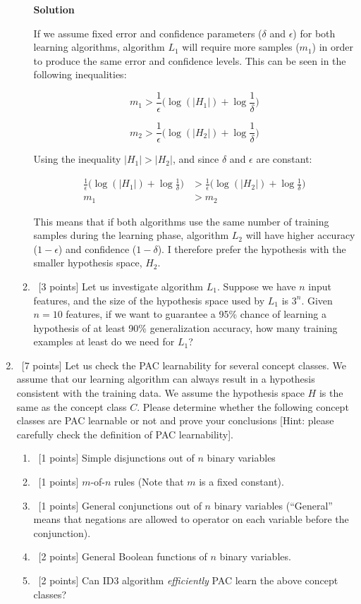\documentclass[12pt, fullpage,letterpaper]{article}
\newcommand{\solution}{\textbf{\large Solution}}
\begin{document}
\begin{enumerate}
\begin{enumerate}
	\solution

	If we assume fixed error and confidence parameters ($\delta$ and $\epsilon$) for both learning algorithms, algorithm $L_1$ will require more samples ($m_1$) in order to produce the same error and confidence levels. This can be seen in the following inequalities: 	
	
	\[
		m_1 > \frac{1}{\epsilon}\big(\log(|H_1|) + \log\frac{1}{\delta}\big)
	\]
	
	\[
		m_2 > \frac{1}{\epsilon}\big(\log(|H_2|) + \log\frac{1}{\delta}\big)
	\]
	
	Using the inequality $|H_1| > |H_2|$, and since $\delta$ and $\epsilon$ are constant:
	
	\[
		\begin{split}
			 \frac{1}{\epsilon}\big(\log(|H_1|) + \log\frac{1}{\delta}\big) &> \frac{1}{\epsilon}\big(\log(|H_2|) + \log\frac{1}{\delta}\big)
			 \\
			 m_1 &> m_2
		\end{split}
	\]
	
	This means that if both algorithms use the same number of training samples during the learning phase, algorithm $L_2$ will have higher accuracy ($1-\epsilon$) and confidence ($1-\delta$). I therefore prefer the hypothesis with the smaller hypothesis space, $H_2$.
	
	\item~[3 points] Let us investigate algorithm $L_1$. Suppose we have $n$ input features, and the size of the hypothesis space used by $L_1$ is $3^n$. Given $n=10$ features, if we want to guarantee a 95\% chance of learning a hypothesis of at least 90\% generalization accuracy, how many training examples at least do we need for $L_1$?
\end{enumerate}

\item~[7 points] Let us check the PAC learnability for several concept classes. We assume that our learning algorithm can always result in a hypothesis consistent with the training data. We assume the hypothesis space $H$ is the same as the concept class $C$. Please determine whether the following concept classes are PAC learnable or not and prove your conclusions [Hint: please carefully check the definition of PAC learnability]. 
\begin{enumerate}
	\item~[1 points] Simple disjunctions out of $n$ binary variables
	\item~[1 points] $m$-of-$n$ rules (Note that $m$ is a fixed constant).  
	\item~[1 points] General conjunctions out of $n$ binary variables (``General'' means that negations are allowed to operator on each variable before the conjunction).
	\item~[2 points] General Boolean functions of $n$ binary variables. 
	\item~[2 points] Can ID3 algorithm \textit{efficiently} PAC learn the above concept classes? 
\end{enumerate}


\end{enumerate}
\end{document}
